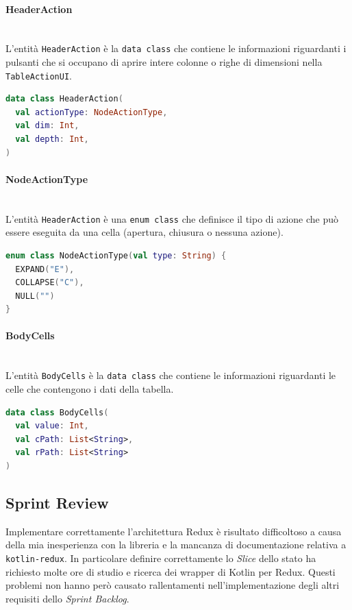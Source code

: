 \paragraph*{HeaderAction} \mbox{} \\
L'entità \verb|HeaderAction| è la \verb|data class| che contiene le informazioni riguardanti i pulsanti che si occupano di aprire intere colonne o righe di dimensioni nella \verb|TableActionUI|.
\begin{lstlisting}[caption={HeaderAction}, label={lst:headeraction}, language=Kotlin]
data class HeaderAction(
  val actionType: NodeActionType,
  val dim: Int,
  val depth: Int,
)
\end{lstlisting}

\paragraph*{NodeActionType} \mbox{} \\
L'entità \verb|HeaderAction| è una \verb|enum class| che definisce il tipo di azione che può essere eseguita da una cella (apertura, chiusura o nessuna azione).
\begin{lstlisting}[caption={NodeActionType}, label={lst:nodeactiontype}, language=Kotlin]
enum class NodeActionType(val type: String) {
  EXPAND("E"),
  COLLAPSE("C"),
  NULL("")
}
\end{lstlisting}

\paragraph*{BodyCells} \mbox{} \\
L'entità \verb|BodyCells| è la \verb|data class| che contiene le informazioni riguardanti le celle che contengono i dati della tabella.
\begin{lstlisting}[caption={BodyCells}, label={lst:bodycells}, language=Kotlin]
data class BodyCells(
  val value: Int,
  val cPath: List<String>,
  val rPath: List<String>
)
\end{lstlisting}

\subsection{Sprint Review}
Implementare correttamente l'architettura Redux è risultato difficoltoso a causa della mia inesperienza con la libreria e la mancanza di documentazione relativa a \verb|kotlin-redux|. In particolare definire correttamente lo \emph{Slice} dello stato ha richiesto molte ore di studio e ricerca dei wrapper di Kotlin per Redux. Questi problemi non hanno però causato rallentamenti nell'implementazione degli altri requisiti dello \emph{Sprint Backlog}.

